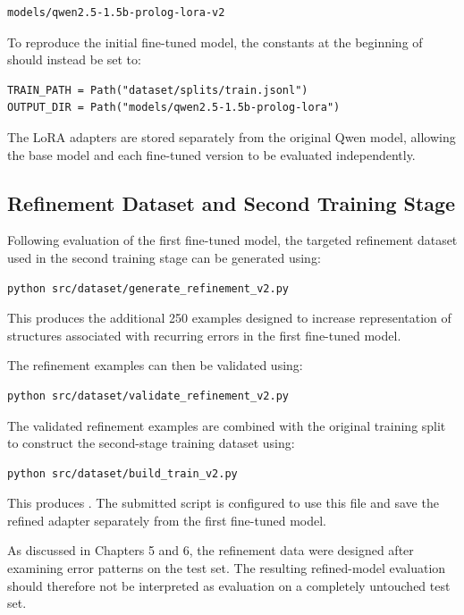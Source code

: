 \documentclass[11pt]{article} %
\theoremstyle{plain}
\theoremstyle{definition}
\begin{document}
\begin{lstlisting}
models/qwen2.5-1.5b-prolog-lora-v2
\end{lstlisting}

To reproduce the initial fine-tuned model, the constants at the beginning of
 should instead be set to:

\begin{lstlisting}
TRAIN_PATH = Path("dataset/splits/train.jsonl")
OUTPUT_DIR = Path("models/qwen2.5-1.5b-prolog-lora")
\end{lstlisting}

The LoRA adapters are stored separately from the original Qwen model, allowing
the base model and each fine-tuned version to be evaluated independently.


\subsection{Refinement Dataset and Second Training Stage}

Following evaluation of the first fine-tuned model, the targeted refinement
dataset used in the second training stage can be generated using:

\begin{lstlisting}
python src/dataset/generate_refinement_v2.py
\end{lstlisting}

This produces the additional 250 examples designed to increase representation
of structures associated with recurring errors in the first fine-tuned model.

The refinement examples can then be validated using:

\begin{lstlisting}
python src/dataset/validate_refinement_v2.py
\end{lstlisting}

The validated refinement examples are combined with the original training
split to construct the second-stage training dataset using:

\begin{lstlisting}
python src/dataset/build_train_v2.py
\end{lstlisting}

This produces . The submitted
 script is configured to use this file and
save the refined adapter separately from the first fine-tuned model.

As discussed in Chapters 5 and 6, the refinement data were designed after
examining error patterns on the test set. The resulting refined-model
evaluation should therefore not be interpreted as evaluation on a completely
untouched test set.
\end{document}
